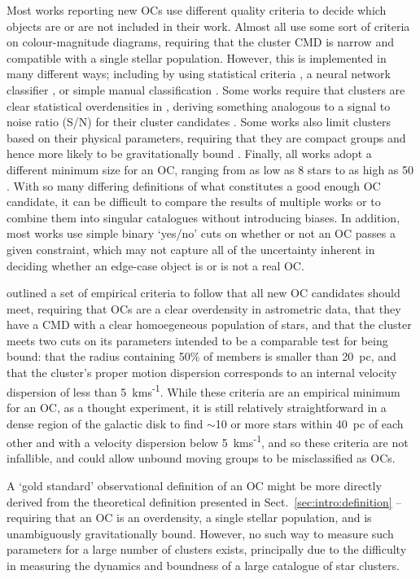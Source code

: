 Most works reporting new OCs use different quality criteria to decide which objects are or are not included in their work. Almost all use some sort of criteria on colour-magnitude diagrams, requiring that the cluster CMD is narrow and compatible with a single stellar population. However, this is implemented in many different ways; including by using statistical criteria \citep[e.g.][]{liu_catalog_2019}, a neural network classifier \citep[e.g.][]{castro-ginard_new_2018}, or simple manual classification \citep[e.g.][]{he_catalogue_2021}. Some works require that clusters are clear statistical overdensities in \gaia, deriving something analogous to a signal to noise ratio (S/N) for their cluster candidates \citep[e.g.][]{cantat-gaudin_gaia_2019}. Some works also limit clusters based on their physical parameters, requiring that they are compact groups and hence more likely to be gravitationally bound \citep[e.g.][]{liu_catalog_2019}. Finally, all works adopt a different minimum size for an OC, ranging from as low as 8 stars \citep{castro-ginard_new_2018} to as high as 50 \citep{liu_catalog_2019}. With so many differing definitions of what constitutes a good enough OC candidate, it can be difficult to compare the results of multiple works or to combine them into singular catalogues without introducing biases. In addition, most works use simple binary `yes/no' cuts on whether or not an OC passes a given constraint, which may not capture all of the uncertainty inherent in deciding whether an edge-case object is or is not a real OC.

\cite{cantat-gaudin_clusters_2020} outlined a set of empirical criteria to follow that all new OC candidates should meet, requiring that OCs are a clear overdensity in astrometric data, that they have a CMD with a clear homoegeneous population of stars, and that the cluster meets two cuts on its parameters intended to be a comparable test for being bound: that the radius containing 50\% of members is smaller than 20~pc, and that the cluster's proper motion dispersion corresponds to an internal velocity dispersion of less than 5~kms\textsuperscript{-1}. While these criteria are an empirical minimum for an OC, as a thought experiment, it is still relatively straightforward in a dense region of the galactic disk to find $\sim$10 or more stars within 40~pc of each other and with a velocity dispersion below 5~kms\textsuperscript{-1}, and so these criteria are not infallible, and could allow unbound moving groups to be misclassified as OCs.

A `gold standard' observational definition of an OC might be more directly derived from the theoretical definition presented in Sect.~\ref{sec:intro:definition} -- requiring that an OC is an overdensity, a single stellar population, and is unambiguously gravitationally bound. However, no such way to measure such parameters for a large number of clusters exists, principally due to the difficulty in measuring the dynamics and boundness of a large catalogue of star clusters.


